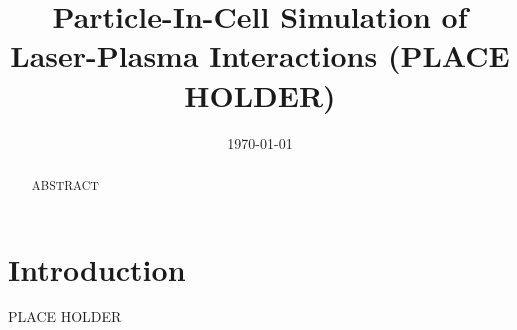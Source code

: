 \documentclass[letter,10pt]{article}
\title{Particle-In-Cell Simulation of Laser-Plasma Interactions (PLACE HOLDER)}
\author{Brian Albright \and \and Kevin Barker \and Ben Bergen \and Kevin Bowers \and Darren Kerbyson \and Lin Yin}
\date{\today}
\begin{document}
\maketitle
\thispagestyle{empty}

\begin{abstract}
ABSTRACT
\end{abstract}

\section*{Introduction}
PLACE HOLDER

%
%

\end{document}
